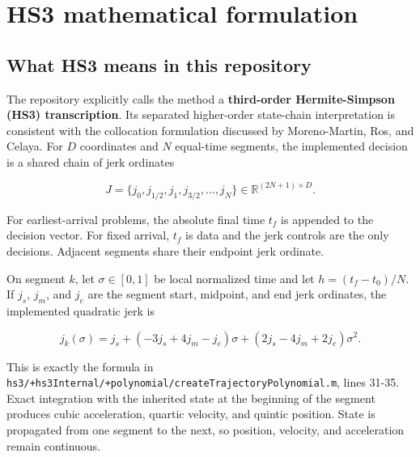 \documentclass[10pt,letterpaper]{article}
\newcommand{\file}[1]{\nolinkurl{#1}}
\newcommand{\src}[2]{\file{#1}, lines #2}
\newcommand{\term}[1]{\textbf{#1}}
\begin{document}
\section{HS3 mathematical formulation}\label{sec:math}

\subsection{What HS3 means in this repository}

The repository explicitly calls the method a \term{third-order
Hermite-Simpson (HS3) transcription}. Its separated higher-order state-chain
interpretation is consistent with the collocation formulation discussed by
Moreno-Martin, Ros, and Celaya\cite{moreno2024}. For $D$ coordinates and $N$
equal-time segments, the implemented decision is a shared chain of jerk
ordinates

\begin{equation}
J = \{j_0,j_{1/2},j_1,j_{3/2},\ldots,j_N\}
\in \mathbb{R}^{(2N+1)\times D}.
\end{equation}

For earliest-arrival problems, the absolute final time $t_f$ is appended to
the decision vector. For fixed arrival, $t_f$ is data and the jerk controls are
the only decisions. Adjacent segments share their endpoint jerk ordinate.

On segment $k$, let $\sigma\in[0,1]$ be local normalized time and let
$h=(t_f-t_0)/N$. If $j_s$, $j_m$, and $j_e$ are the segment start, midpoint,
and end jerk ordinates, the implemented quadratic jerk is

\begin{equation}\label{eq:jerk}
j_k(\sigma)=j_s+(-3j_s+4j_m-j_e)\sigma
 +(2j_s-4j_m+2j_e)\sigma^2.
\end{equation}

This is exactly the formula in
\src{hs3/+hs3Internal/+polynomial/createTrajectoryPolynomial.m}{31-35}.
Exact integration with the inherited state at the beginning of the segment
produces cubic acceleration, quartic velocity, and quintic position. State is
propagated from one segment to the next, so position, velocity, and
acceleration remain continuous.
\end{document}
